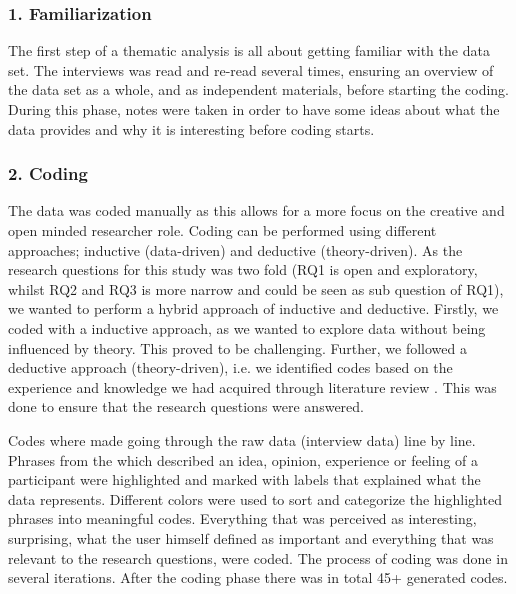     \subsubsection{1. Familiarization}
    The first step of a thematic analysis is all about getting familiar with the data set. The interviews was read and re-read several times, ensuring an overview of the data set as a whole, and as independent materials, before starting the coding. During this phase, notes were taken in order to have some ideas about what the data provides and why it is interesting before coding starts.
    
    \subsubsection{2. Coding}
    The data was coded manually as this allows for a more focus on the creative and open minded researcher role. 
    Coding can be performed using different approaches; inductive (data-driven) and deductive (theory-driven). As the research questions for this study was two fold  (RQ1 is open and exploratory, whilst RQ2 and RQ3 is more narrow and could be seen as sub question of RQ1), we wanted to perform a hybrid approach of inductive and deductive. Firstly, we coded with a inductive approach, as we wanted to explore data without being influenced by theory. This proved to be challenging. %
    Further, we followed a deductive approach (theory-driven), i.e. we identified codes based on the experience and knowledge we had acquired through literature review \cite{braun_using_2006}. This was done to ensure that the research questions were answered. 
    
Codes where made going through the raw data (interview data) line by line. Phrases from the which described an idea, opinion, experience or feeling of a participant were highlighted and marked with labels that explained what the data represents. Different colors were used to sort and categorize the highlighted phrases into meaningful codes. Everything that was perceived as interesting, surprising, what the user himself defined as important and everything that was relevant to the research questions, were coded. The process of coding was done in several iterations. After the coding phase there was in total 45+ generated codes.  
    
